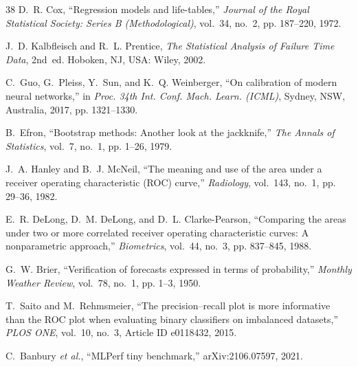 \documentclass[11pt,a4paper]{article}
\begin{document}
\begin{thebibliography}{38}
D.~R. Cox, ``Regression models and life-tables,'' \emph{Journal of the Royal Statistical Society: Series B (Methodological)}, vol.~34, no.~2, pp. 187--220, 1972.

J.~D. Kalbfleisch and R.~L. Prentice, \emph{The Statistical Analysis of Failure Time Data}, 2nd~ed. Hoboken, NJ, USA: Wiley, 2002.

C.~Guo, G.~Pleiss, Y.~Sun, and K.~Q. Weinberger, ``On calibration of modern neural networks,'' in \emph{Proc. 34th Int. Conf. Mach. Learn. (ICML)}, Sydney, NSW, Australia, 2017, pp. 1321--1330.

B.~Efron, ``Bootstrap methods: Another look at the jackknife,'' \emph{The Annals of Statistics}, vol.~7, no.~1, pp. 1--26, 1979.

J.~A. Hanley and B.~J. McNeil, ``The meaning and use of the area under a receiver operating characteristic (ROC) curve,'' \emph{Radiology}, vol.~143, no.~1, pp. 29--36, 1982.

E.~R. DeLong, D.~M. DeLong, and D.~L. Clarke-Pearson, ``Comparing the areas under two or more correlated receiver operating characteristic curves: A nonparametric approach,'' \emph{Biometrics}, vol.~44, no.~3, pp. 837--845, 1988.

G.~W. Brier, ``Verification of forecasts expressed in terms of probability,'' \emph{Monthly Weather Review}, vol.~78, no.~1, pp. 1--3, 1950.

T.~Saito and M.~Rehmsmeier, ``The precision--recall plot is more informative than the ROC plot when evaluating binary classifiers on imbalanced datasets,'' \emph{PLOS ONE}, vol.~10, no.~3, Article ID e0118432, 2015.

C.~Banbury \emph{et al.}, ``MLPerf tiny benchmark,'' arXiv:2106.07597, 2021.

\end{thebibliography}
\end{document}
